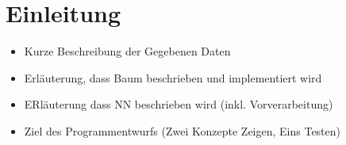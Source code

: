 \section{Einleitung}\label{sec:einleitung}
\begin{itemize}
    \item Kurze Beschreibung der Gegebenen Daten
    \item Erläuterung, dass Baum beschrieben und implementiert wird
    \item ERläuterung dass NN beschrieben wird (inkl. Vorverarbeitung)
    \item Ziel des Programmentwurfs (Zwei Konzepte Zeigen, Eins Testen)
\end{itemize}